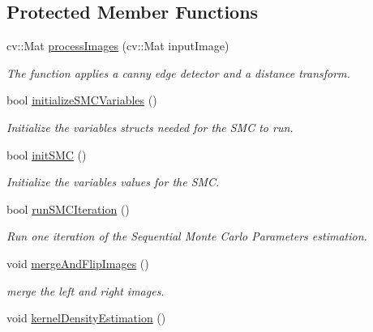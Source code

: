 \subsection*{Protected Member Functions}
\begin{DoxyCompactItemize}
\item 
cv\+::\+Mat \hyperlink{classhandPoseEstimationModule_a50367df17ce84fad3013c9d1ad8046ef}{process\+Images} (cv\+::\+Mat input\+Image)
\begin{DoxyCompactList}\small\item\em The function applies a canny edge detector and a distance transform. \end{DoxyCompactList}\item 
bool \hyperlink{classhandPoseEstimationModule_aafbe3332af03ca7e53a8c10f88aa053b}{initialize\+S\+M\+C\+Variables} ()
\begin{DoxyCompactList}\small\item\em Initialize the variables structs needed for the S\+MC to run. \end{DoxyCompactList}\item 
bool \hyperlink{classhandPoseEstimationModule_ad4081c972d64010b87be4ba10a8b967d}{init\+S\+MC} ()
\begin{DoxyCompactList}\small\item\em Initialize the variables values for the S\+MC. \end{DoxyCompactList}\item 
bool \hyperlink{classhandPoseEstimationModule_a05f882cb3c4c6db81ec2e206cd7eb695}{run\+S\+M\+C\+Iteration} ()
\begin{DoxyCompactList}\small\item\em Run one iteration of the Sequential Monte Carlo Parameters estimation. \end{DoxyCompactList}\item 
void \hyperlink{classhandPoseEstimationModule_ab347a264eb373426ecc9e96cf05bafb9}{merge\+And\+Flip\+Images} ()
\begin{DoxyCompactList}\small\item\em merge the left and right images. \end{DoxyCompactList}\item 
void \hyperlink{classhandPoseEstimationModule_ae3b532f8f459b758a8897a4f05dfe704}{kernel\+Density\+Estimation} ()\label{classhandPoseEstimationModule_ae3b532f8f459b758a8897a4f05dfe704}


\end{DoxyCompactItemize}

